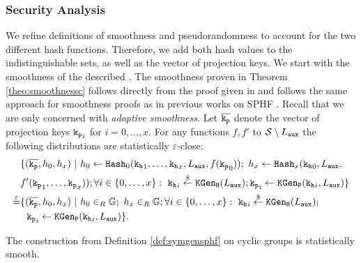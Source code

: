 \subsubsection{Security Analysis}
We refine definitions of smoothness and pseudorandomness to account for the two different hash functions.
Therefore, we add both hash values to the indistinguishable sets, as well as the vector of projection keys.
We start with the smoothness of the described \SPHFF.
The smoothness proven in Theorem \ref{theo:smoothnessc} follows directly from the proof given in \cite[Appendix D.3]{cryptoeprint:2013:034} and follows the same approach for smoothness proofs as in previous works on SPHF \cite{cryptoeprint:2013:034,Gennaro2003,Katz2011}.
Recall that we are only concerned with \emph{adaptive smoothness}.
Let $\overline{\mathtt{k_p}}$ denote the vector of projection keys $\mathtt{k_p}_i$ for $i=0,\dots,x$.
For any functions $f,f'$ to $\mathcal{S}\setminus L_\mathtt{aux}$ the following distributions are statistically $\varepsilon$-close:
\begin{align*}
& \{(\overline{\mathtt{k_p}},h_0,h_x) ~|~ h_0\gets\mathtt{Hash}_0(\mathtt{k_h}_1,\dots,\mathtt{k_h}_x,L_\mathtt{aux},f(\mathtt{k_p}_0));~ h_x\gets\mathtt{Hash}_x(\mathtt{k_h}_0,L_\mathtt{aux}, \\
& f'(\mathtt{k_p}_1,\dots,\mathtt{k_p}_x)); \forall i\in\{0,\dots,x\}:~ \mathtt{k_h}_i\stackrel{\$}{\gets}\mathtt{KGen_H}(L_\mathtt{aux}); \mathtt{k_p}_i\gets\mathtt{KGen_P}(\mathtt{k_h}_i,L_\mathtt{aux})\} \\
\stackrel{\varepsilon}{=} & \{(\overline{\mathtt{k_p}},h_0,h_x) ~|~ h_0\in_R\mathbb{G};~ h_x\in_R\mathbb{G}; \forall i\in\{0,\dots,x\}:~ \mathtt{k_h}_i\stackrel{\$}{\gets}\mathtt{KGen_H}(L_\mathtt{aux}); \\
& ~~\mathtt{k_p}_i\gets\mathtt{KGen_P}(\mathtt{k_h}_i,L_\mathtt{aux})\}.
\end{align*}

\begin{theorem}\label{theo:smoothnessc}
The \SPHFF construction from Definition \ref{def:symgensphf} on cyclic groups is statistically smooth.
\end{theorem}

